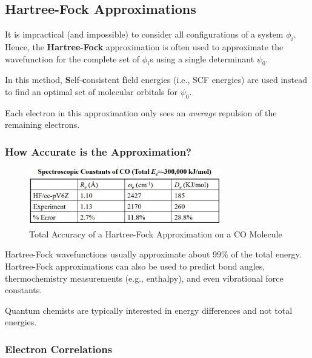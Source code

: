 \documentclass[
  letterpaper,
  DIV=11,
  numbers=noendperiod]{scrreprt}
\begin{document}
\hypertarget{hartree-fock-approximations}{%
\subsection{Hartree-Fock
Approximations}\label{hartree-fock-approximations}}

It is impractical (and impossible) to consider all configurations of a
system \(\phi_i\). Hence, the \textbf{Hartree-Fock} approximation is
often used to approximate the wavefunction for the complete set of
\(\phi_i\)s using a single determinant \(\psi_0\).

In this method, \textbf{S}elf-\textbf{c}onsistent \textbf{f}ield
energies (i.e., SCF energies) are used instead to find an optimal set of
molecular orbitals for \(\psi_0\).

Each electron in this approximation only sees an \emph{average}
repulsion of the remaining electrons.

\hypertarget{how-accurate-is-the-approximation}{%
\subsubsection{How Accurate is the
Approximation?}\label{how-accurate-is-the-approximation}}

\begin{figure}

{\centering \includegraphics[width=3.31in,height=\textheight]{./images/wk2a/fock.jpg}

}

\caption{Total Accuracy of a Hartree-Fock Approximation on a CO
Molecule}

\end{figure}

Hartree-Fock wavefunctions usually approximate about 99\% of the total
energy. Hartree-Fock approximations can also be used to predict bond
angles, thermochemistry measurements (e.g., enthalpy), and even
vibrational force constants.

Quantum chemists are typically interested in energy differences and not
total energies.

\hypertarget{electron-correlations}{%
\subsubsection{Electron Correlations}\label{electron-correlations}}
\end{document}
